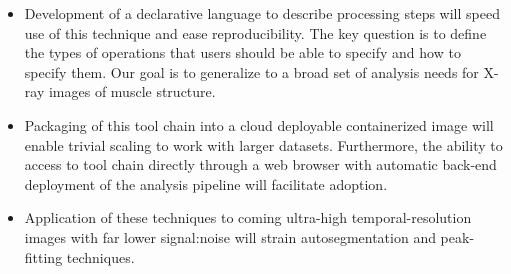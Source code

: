 \documentclass{sig-alternate}
\begin{document}
\begin{itemize}[noitemsep]
\item Development of a declarative language to describe processing
    steps will speed use of this technique and ease reproducibility.
    The key question is to define the types of operations that users
    should be able to specify and how to specify them. Our goal is to
    generalize to a broad set of analysis needs for X-ray images of
    muscle structure.
\item Packaging of this tool chain into a cloud deployable
    containerized image will enable trivial scaling to work with
    larger datasets. Furthermore, the ability to access to tool chain
    directly through a web browser with automatic back-end deployment
    of the analysis pipeline will facilitate adoption. 
\item Application of these techniques to coming ultra-high
    temporal-resolution images with far lower signal:noise will strain
    autosegmentation and peak-fitting techniques. 
\end{itemize}


%
%


\scriptsize


\end{document}
